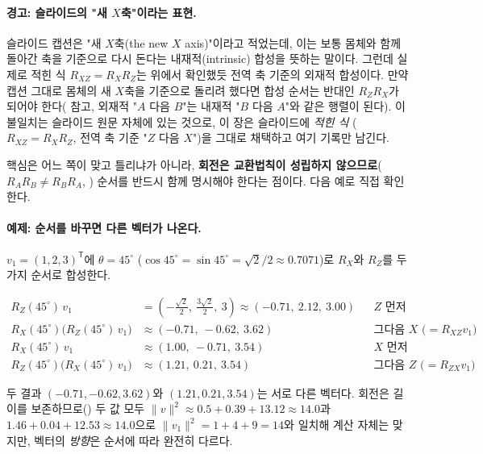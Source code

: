 \paragraph{경고: 슬라이드의 "새 $X$축"이라는 표현.}
슬라이드 캡션은 "새 $X$축(the new $X$ axis)"이라고 적었는데, 이는 보통 몸체와
함께 돌아간 축을 기준으로 다시 돈다는 내재적(intrinsic) 합성을 뜻하는 말이다.
그런데 실제로 적힌 식 $R_{XZ} = R_X R_Z$는 위에서 확인했듯 전역 축 기준의
외재적 합성이다. 만약 캡션 그대로 몸체의 새 $X$축을 기준으로 돌리려 했다면
합성 순서는 반대인 $R_Z R_X$가 되어야 한다( 참고, 외재적
"$A$ 다음 $B$"는 내재적 "$B$ 다음 $A$"와 같은 행렬이 된다). 이 불일치는
슬라이드 원문 자체에 있는 것으로, 이 장은 슬라이드에 \emph{적힌 식}
($R_{XZ} = R_X R_Z$, 전역 축 기준 "$Z$ 다음 $X$")을 그대로 채택하고 여기 기록만
남긴다.

핵심은 어느 쪽이 맞고 틀리냐가 아니라, \textbf{회전은 교환법칙이 성립하지
않으므로}($R_A R_B \neq R_B R_A$, ) 순서를 반드시 함께
명시해야 한다는 점이다. 다음 예로 직접 확인한다.

\paragraph{예제: 순서를 바꾸면 다른 벡터가 나온다.}
$v_1 = (1, 2, 3)^{\mathsf{T}}$에 $\theta = 45^\circ$
($\cos 45^\circ = \sin 45^\circ = \sqrt{2}/2 \approx 0.7071$)로 $R_X$와 $R_Z$를
두 가지 순서로 합성한다.

\begin{align*}
R_Z(45^\circ)\,v_1 &= \left(-\tfrac{\sqrt{2}}{2},\ \tfrac{3\sqrt{2}}{2},\ 3\right)
   \approx (-0.71,\ 2.12,\ 3.00) && \text{$Z$ 먼저}\\
R_X(45^\circ)\bigl(R_Z(45^\circ)\,v_1\bigr)
   &\approx (-0.71,\ -0.62,\ 3.62) && \text{그다음 $X$ ($=R_{XZ}v_1$)}\\[6pt]
R_X(45^\circ)\,v_1 &\approx (1.00,\ -0.71,\ 3.54) && \text{$X$ 먼저}\\
R_Z(45^\circ)\bigl(R_X(45^\circ)\,v_1\bigr)
   &\approx (1.21,\ 0.21,\ 3.54) && \text{그다음 $Z$ ($=R_{ZX}v_1$)}
\end{align*}

두 결과 $(-0.71, -0.62, 3.62)$와 $(1.21, 0.21, 3.54)$는 서로 다른 벡터다.
회전은 길이를 보존하므로() 두 값 모두
$\lVert v \rVert^2 \approx 0.5 + 0.39 + 13.12 \approx 14.0$과
$1.46 + 0.04 + 12.53 \approx 14.0$으로 $\lVert v_1 \rVert^2 = 1+4+9=14$와
일치해 계산 자체는 맞지만, 벡터의 \emph{방향}은 순서에 따라 완전히 다르다.

